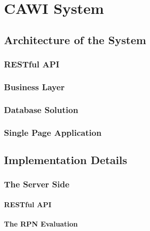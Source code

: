 \chapter{CAWI System}\label{ch:cawiSystem}
	
	\section{Architecture of the System}\label{sec:cawiSystem:architecture}
		
		\subsection{RESTful API}\label{sec:cawiSystem:restful}
			
		\subsection{Business Layer}\label{sec:cawiSystem:businessLayer}
			
		\subsection{Database Solution}\label{sec:cawiSystem:database}
			
		\subsection{Single Page Application}\label{sec:cawiSystem:spa}
			

	\section{Implementation Details}\label{sec:cawiSystem:implementation}
		
		\subsection{The Server Side}\label{sec:cawiSystem:serverSide}
			
			\subsubsection{RESTful API}\label{sec:cawiSystem:restfulImplementation}
				
			\subsubsection{The RPN Evaluation}\label{sec:cawiSystem:rpnEvaluation}
				
